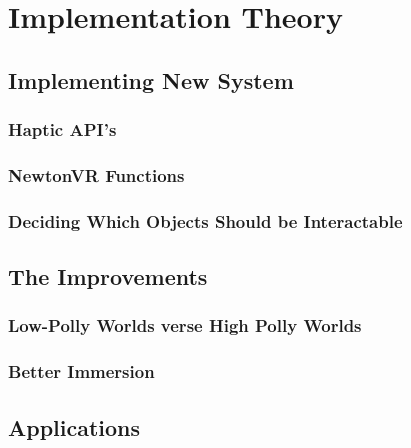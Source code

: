 \chapter{Implementation Theory}\label{Implementation Theory}

\section{Implementing New System}\label{implementing new system}


\subsection{Haptic API's}\label{API}

\subsection{NewtonVR Functions}\label{API}

\subsection{Deciding Which Objects Should be Interactable}\label{API}



\section{The Improvements}\label{Improvements with new system implemented}

\subsection{Low-Polly Worlds verse High Polly Worlds}\label{low polly vs. high polly}

\subsection{Better Immersion }\label{better immersion with new system implemented}

\section{Applications}\label{new system applications}